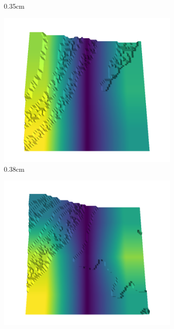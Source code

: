 \begin{figure}[H]
\begin{subfigure}[b]{0.192\linewidth}
    \caption{0.35cm}
    \label{fig : quarry-best-4}
    \end{subfigure}
    \begin{subfigure}[b]{0.192\linewidth}
    \includegraphics[width=\linewidth]{../img/5/quarry/best/38-patch-3d-majavi-colormap-40.png}
    \caption{0.38cm}
    \label{fig : quarry-best-5}
    \end{subfigure}
    \begin{subfigure}[b]{0.192\linewidth}
    \includegraphics[width=\linewidth]{../img/5/quarry/best/41-patch-3d-majavi-colormap-50.png}

\end{subfigure}
\end{figure}
